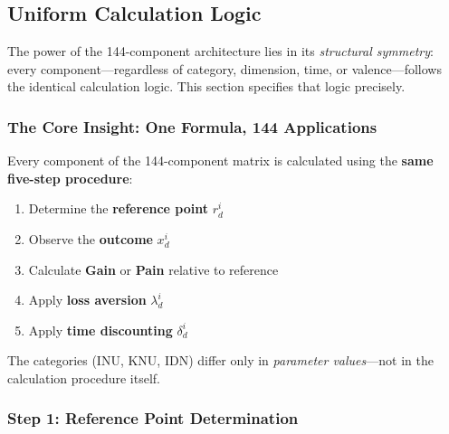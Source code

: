 \subsection{Uniform Calculation Logic}
\label{subsec:calculation-logic}


The power of the 144-component architecture lies in its \emph{structural symmetry}:
every component---regardless of category, dimension, time, or valence---follows
the identical calculation logic. This section specifies that logic precisely.

\subsubsection{The Core Insight: One Formula, 144 Applications}

\begin{tcolorbox}[colback=blue!5!white, colframe=blue!75!black, title=The Uniform Calculation Principle]
Every component of the 144-component matrix is calculated using the 
\textbf{same five-step procedure}:

\begin{enumerate}
\item Determine the \textbf{reference point} $r^i_d$
\item Observe the \textbf{outcome} $x^i_d$
\item Calculate \textbf{Gain} or \textbf{Pain} relative to reference
\item Apply \textbf{loss aversion} $\lambda^i_d$
\item Apply \textbf{time discounting} $\delta^i_d$
\end{enumerate}

The categories (INU, KNU, IDN) differ only in \emph{parameter values}---not 
in the calculation procedure itself.
\end{tcolorbox}

\subsubsection{Step 1: Reference Point Determination}

